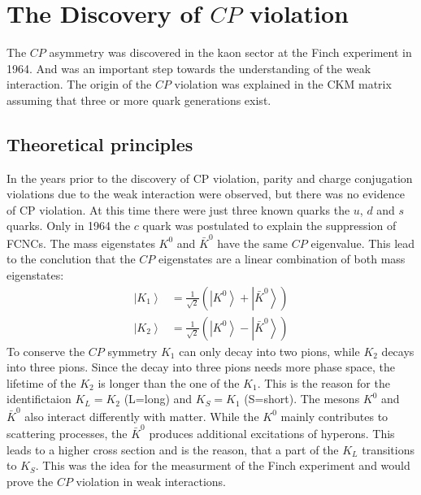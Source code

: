 \section{The Discovery of $CP$ violation \cite{Kaonen}}
The $CP$ asymmetry was discovered in the kaon sector at the Finch experiment in 1964. And was an important step towards the understanding of the weak interaction. The origin of the $CP$ violation was explained in the CKM matrix assuming that three or more quark generations exist.

\subsection{Theoretical principles}
In the years prior to the discovery of CP violation, parity and charge conjugation violations due to the weak interaction were observed, but there was no evidence of CP violation. At this time there were just three known quarks the $u$, $d$ and $s$ quarks. Only in 1964 the $c$ quark was postulated to explain the suppression of FCNCs. The mass eigenstates $K^0$ and $\bar{K}^0$ have the same $CP$ eigenvalue. This lead to the conclution that the $CP$ eigenstates are a linear combination of both mass eigenstates:
\begin{align*}
    \left|K_1 \right> &= \frac{1}{\sqrt{2}} \left(\left|K^0\right> +
                        \left|\bar{K}^0\right> \right) \\
    \left|K_2 \right> &= \frac{1}{\sqrt{2}} \left(\left|K^0\right> -
                        \left|\bar{K}^0\right> \right)
\end{align*}
To conserve the $CP$ symmetry $K_1$ can only decay into two pions, while $K_2$ decays into three pions. Since the decay into three pions needs more phase space, the lifetime of the $K_2$ is longer than the one of the $K_1$. This is the reason for the identifictaion $K_L =K_2$ (L=long) and $K_S =K_1$ (S=short). The mesons $K^0$ and $\bar{K}^0$ also interact differently with matter. While the $K^0$ mainly contributes to scattering processes, the $\bar{K}^0$ produces additional excitations of hyperons. This leads to a higher cross section and is the reason, that a part of the $K_L$ transitions to $K_S$. This was the idea for the measurment of the Finch experiment and would prove the $CP$ violation in weak interactions.

